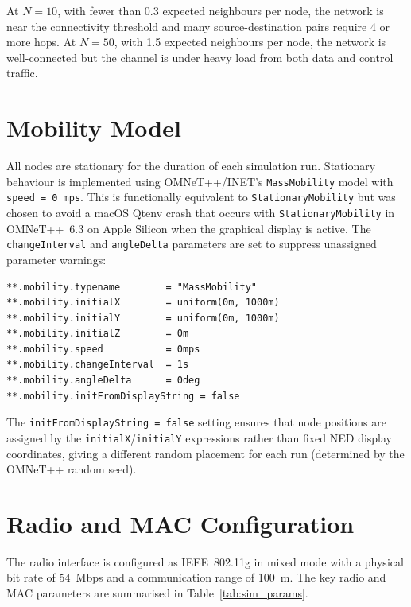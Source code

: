 At $N = 10$, with fewer than 0.3 expected neighbours per node, the network is near the
connectivity threshold and many source-destination pairs require 4 or more hops. At
$N = 50$, with 1.5 expected neighbours per node, the network is well-connected but the
channel is under heavy load from both data and control traffic.

\section{Mobility Model}

All nodes are stationary for the duration of each simulation run. Stationary behaviour
is implemented using OMNeT++/INET's \texttt{MassMobility} model with
\texttt{speed = 0~mps}. This is functionally equivalent to \texttt{StationaryMobility}
but was chosen to avoid a macOS Qtenv crash that occurs with \texttt{StationaryMobility}
in OMNeT++~6.3 on Apple Silicon when the graphical display is active. The
\texttt{changeInterval} and \texttt{angleDelta} parameters are set to suppress
unassigned parameter warnings:

\begin{lstlisting}[caption={Mobility configuration in \texttt{omnetpp.ini}.}]
**.mobility.typename        = "MassMobility"
**.mobility.initialX        = uniform(0m, 1000m)
**.mobility.initialY        = uniform(0m, 1000m)
**.mobility.initialZ        = 0m
**.mobility.speed           = 0mps
**.mobility.changeInterval  = 1s
**.mobility.angleDelta      = 0deg
**.mobility.initFromDisplayString = false
\end{lstlisting}

The \texttt{initFromDisplayString = false} setting ensures that node positions are
assigned by the \texttt{initialX}/\texttt{initialY} expressions rather than fixed NED
display coordinates, giving a different random placement for each run (determined by the
OMNeT++ random seed).

\section{Radio and MAC Configuration}

The radio interface is configured as IEEE~802.11g in mixed mode with a physical bit rate
of 54~Mbps and a communication range of 100~m. The key radio and MAC parameters are
summarised in Table~\ref{tab:sim_params}.

